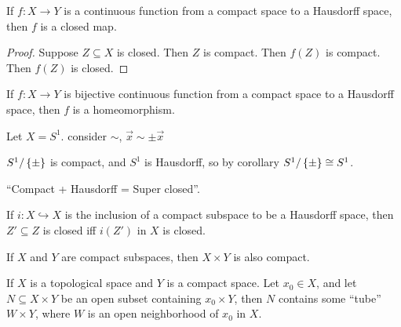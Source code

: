 \documentclass[12pt, twosided]{article}
\begin{document}
\begin{cor}
  If \(f:X \to Y\) is a continuous function from a compact space to a Hausdorff space, then \(f\) is a closed map.
\end{cor}

\begin{proof}
  Suppose \(Z \subseteq X\) is closed. Then \(Z\) is compact. Then \(f(Z)\) is compact. Then \(f(Z)\) is closed.
\end{proof}
\begin{cor}
  If \(f:X \to Y\) is bijective continuous function from a compact space to a Hausdorff space, then \(f\) is a homeomorphism.
\end{cor}

\begin{exa}
  Let \(X = S^1\). consider \(\sim\), \(\vec{x} \sim \pm \vec{x}\)

  \begin{center}
  \end{center}

  \(S^1/\left\{ \pm \right\}\) is compact, and \(S^1\) is Hausdorff, so by corollary \(S^1/\left\{ \pm \right\} \cong S^1\).
\end{exa}
\begin{framed}
  ``Compact + Hausdorff = Super closed''.

  If \(i: X \hookrightarrow X\) is the inclusion of a compact subspace to be a Hausdorff space, then \(Z\prime \subseteq Z\) is closed iff \(i(Z\prime)\) in \(X\) is closed.
\end{framed}
\begin{thm}
  If \(X\) and \(Y\) are compact subspaces, then \(X \times Y\) is also compact.
\end{thm}

\begin{lm}
  If \(X\) is a topological space and \(Y\) is a compact space. Let \(x_0 \in X\), and let \(N \subseteq X \times Y\) be an open subset containing \(x_0 \times Y\), then \(N\) contains some ``tube'' \(W \times Y\), where \(W\) is an open neighborhood of \(x_0\) in \(X\).
\end{lm}
\end{document}
